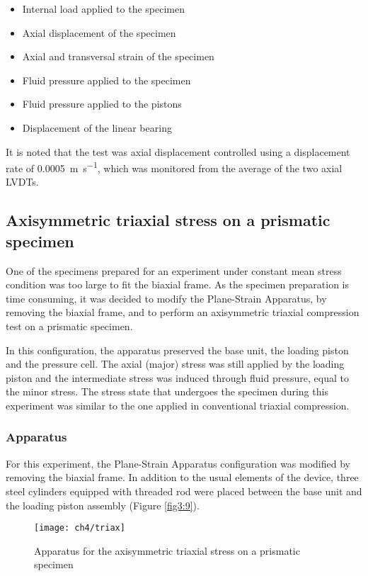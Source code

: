 \begin{itemize}
    \item Internal load applied to the specimen
    \item Axial displacement of the specimen
    \item Axial and transversal strain of the specimen
    \item Fluid pressure applied to the specimen
    \item Fluid pressure applied to the pistons
    \item Displacement of the linear bearing
\end{itemize}

It is noted that the test was axial displacement controlled using a displacement rate of \SI{0.0005}{\meter\per\second}, which was monitored from the average of the two axial LVDTs.

\subsection{Axisymmetric triaxial stress on a prismatic specimen}

One of the specimens prepared for an experiment under constant mean stress condition was too large to fit the biaxial frame. As the specimen preparation is time consuming, it was decided to modify the Plane-Strain Apparatus, by removing the biaxial frame, and to perform an axisymmetric triaxial compression test on a prismatic specimen. 

In this configuration, the apparatus preserved the base unit, the loading piston and the pressure cell. The axial (major) stress was still applied by the loading piston and the intermediate stress was induced through fluid pressure, equal to the minor stress. The stress state that undergoes the specimen during this experiment was similar to the one applied in conventional triaxial compression. 

\subsubsection{Apparatus}

For this experiment, the Plane-Strain Apparatus configuration was modified by removing the biaxial frame. In addition to the usual elements of the device, three steel cylinders equipped with threaded rod were placed between the base unit and the loading piston assembly (Figure \ref{fig3:9}). 

\begin{figure}[tb]
    \centering
    \texttt{[image: ch4/triax]}
    \captionsetup{justification=centering}
    \caption{Apparatus for the axisymmetric triaxial stress on a prismatic specimen}
    \label{fig4:9}
\end{figure} 

